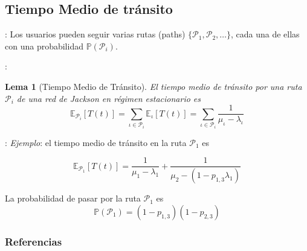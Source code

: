 \documentclass[xcolor={x11names}]{beamer}
\newtheorem{lema}{Lema}[section]
\begin{document}
\subsection{Tiempo Medio de tránsito}
\begin{frame}{\secname: \subsecname}
    Los usuarios pueden seguir varias rutas
    (paths) $\{\mathcal{P}_1,\mathcal{P}_2,
    \ldots\}$, cada una
    de ellas con una probabilidad
    $\mathbb{P}\left( \mathcal{P}_i \right)$.
    \vfill
    \begin{figure}
        
    \end{figure}
\end{frame}


\begin{frame}{\secname: \subsecname}
    \begin{lema}[Tiempo Medio de Tránsito]
        El tiempo medio de tránsito por una
        ruta $\mathcal{P}_i$ de una red
        de Jackson en régimen estacionario es
        \begin{equation}
            \mathbb{E}_{\mathcal{P}_i}[T(t)]
            =\sum_{\iota\in \mathcal{P}_i}
            \mathbb{E}_{\iota}[T(t)]
            =\sum_{\iota\in \mathcal{P}_i}
            \frac{1}{\mu_\iota-\lambda_\iota}
        \end{equation}
    \end{lema}
\end{frame}


\begin{frame}{\secname: \subsecname}
    \textit{Ejemplo}: el tiempo medio de
    tránsito en la ruta $\mathcal{P}_1$ es

    \begin{equation}
        \mathbb{E}_{\mathcal{P}_1}[T(t)]=
        \frac{1}{\mu_1-\lambda_1}+
        \frac{1}{\mu_2-(1-p_{1,3}\lambda_1)}
    \end{equation}

    La probabilidad de pasar por la ruta
    $\mathcal{P}_1$ es
    \begin{equation}
        \mathbb{P}(\mathcal{P}_1)=
        (1-p_{1,3})(1-p_{2,3})
    \end{equation}

    \begin{figure}
        \resizebox{.7\textwidth}{!}{%
        }
    \end{figure}
\end{frame}


\begin{frame}[allowframebreaks]
        \frametitle{Referencias}
        
        
\end{frame}
\end{document}
